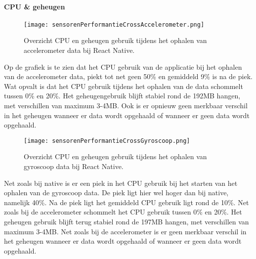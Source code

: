 \paragraph{CPU \& geheugen}
\begin{figure}[H]
    \centering
    \texttt{[image: sensorenPerformantieCrossAccelerometer.png]}
    \caption{Overzicht CPU en geheugen gebruik tijdens het ophalen van accelerometer data bij React Native.}
\end{figure}
Op de grafiek is te zien dat het CPU gebruik van de applicatie bij het ophalen van de accelerometer data,
piekt tot net geen 50\% en gemiddeld 9\% is na de piek. Wat opvalt is dat het CPU gebruik tijdens het ophalen 
van de data schommelt tussen 0\% en 20\%. Het geheugengebruik blijft stabiel rond de 192MB hangen, met verschillen van 
maximum 3-4MB. Ook is er opnieuw geen merkbaar verschil in het 
geheugen wanneer er data wordt opgehaald of wanneer er geen data wordt opgehaald.
\begin{figure}[H]
    \centering
    \texttt{[image: sensorenPerformantieCrossGyroscoop.png]}
    \caption{Overzicht CPU en geheugen gebruik tijdens het ophalen van gyroscoop data bij React Native.}
\end{figure}
Net zoals bij native is er een piek in het CPU gebruik bij het starten van het ophalen van de gyroscoop data. 
De piek ligt hier wel hoger dan bij native, namelijk 40\%. Na de piek ligt het gemiddeld CPU gebruik ligt rond de 10\%. 
Net zoals bij de accelerometer schommelt het CPU gebruik tussen 0\% en 20\%. Het geheugen gebruik blijft terug 
stabiel rond de 197MB hangen, met verschillen van maximum 3-4MB. Net zoals bij de accelerometer is er  
geen merkbaar verschil in het geheugen wanneer er data wordt opgehaald of wanneer er geen 
data wordt opgehaald.
